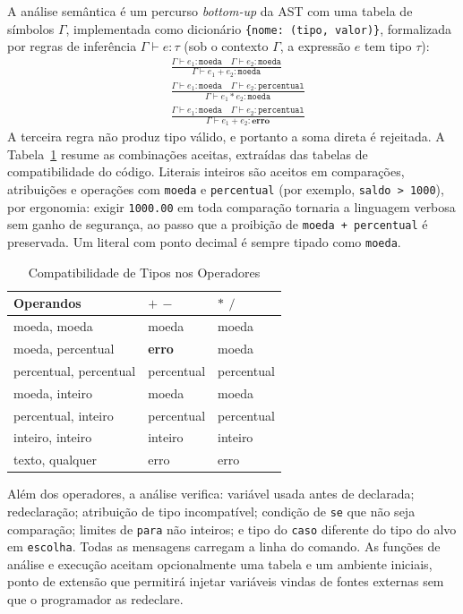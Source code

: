 \documentclass[conference]{IEEEtran}
\begin{document}
A análise semântica é um percurso \textit{bottom-up} da AST com uma tabela de símbolos $\Gamma$, implementada como dicionário \texttt{\{nome: (tipo, valor)\}}, formalizada por regras de inferência $\Gamma \vdash e : \tau$ (sob o contexto $\Gamma$, a expressão $e$ tem tipo $\tau$):
\begin{align}
&\frac{\Gamma \vdash e_1 : \texttt{moeda} \quad \Gamma \vdash e_2 : \texttt{moeda}}{\Gamma \vdash e_1 + e_2 : \texttt{moeda}} \\
&\frac{\Gamma \vdash e_1 : \texttt{moeda} \quad \Gamma \vdash e_2 : \texttt{percentual}}{\Gamma \vdash e_1 * e_2 : \texttt{moeda}} \\
&\frac{\Gamma \vdash e_1 : \texttt{moeda} \quad \Gamma \vdash e_2 : \texttt{percentual}}{\Gamma \vdash e_1 + e_2 : \textbf{erro}}
\end{align}
A terceira regra não produz tipo válido, e portanto a soma direta é rejeitada. A Tabela~\ref{tab:tipos} resume as combinações aceitas, extraídas das tabelas de compatibilidade do código. Literais inteiros são aceitos em comparações, atribuições e operações com \texttt{moeda} e \texttt{percentual} (por exemplo, \texttt{saldo > 1000}), por ergonomia: exigir \texttt{1000.00} em toda comparação tornaria a linguagem verbosa sem ganho de segurança, ao passo que a proibição de \texttt{moeda + percentual} é preservada. Um literal com ponto decimal é sempre tipado como \texttt{moeda}.

\begin{table}[!htbp]
\caption{Compatibilidade de Tipos nos Operadores}
\label{tab:tipos}
\centering
\footnotesize
\begin{tabular}{@{}lll@{}}
\toprule
\textbf{Operandos} & \textbf{$+$ $-$} & \textbf{$*$ $/$} \\
\midrule
moeda, moeda & moeda & moeda \\
moeda, percentual & \textbf{erro} & moeda \\
percentual, percentual & percentual & percentual \\
moeda, inteiro & moeda & moeda \\
percentual, inteiro & percentual & percentual \\
inteiro, inteiro & inteiro & inteiro \\
texto, qualquer & erro & erro \\
\bottomrule
\end{tabular}
\end{table}

Além dos operadores, a análise verifica: variável usada antes de declarada; redeclaração; atribuição de tipo incompatível; condição de \texttt{se} que não seja comparação; limites de \texttt{para} não inteiros; e tipo do \texttt{caso} diferente do tipo do alvo em \texttt{escolha}. Todas as mensagens carregam a linha do comando. As funções de análise e execução aceitam opcionalmente uma tabela e um ambiente iniciais, ponto de extensão que permitirá injetar variáveis vindas de fontes externas sem que o programador as redeclare.
\end{document}
